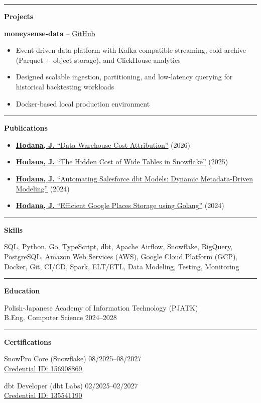 \documentclass[11pt,a4paper]{article}
\begin{document}
\rule{\textwidth}{0.5pt}

\textbf{Projects}

\textbf{moneysense-data} -- \href{https://github.com/joachimhodana/moneysense-data}{GitHub}
\begin{itemize}
\item Event-driven data platform with Kafka-compatible streaming, cold archive (Parquet + object storage), and ClickHouse analytics
\item Designed scalable ingestion, partitioning, and low-latency querying for historical backtesting workloads
\item Docker-based local production environment
\end{itemize}

\rule{\textwidth}{0.5pt}

\textbf{Publications}

\begin{itemize}
\item \href{https://medium.com/lortech-solutions-technical-blog/no-idea-where-your-data-warehouse-spend-goes-7d600666993e}{\textbf{Hodana, J.} ``Data Warehouse Cost Attribution''} (2026)
\item \href{https://medium.com/lortech-solutions-technical-blog/the-hidden-cost-of-wide-tables-in-snowflake-ab4757902c57}{\textbf{Hodana, J.} ``The Hidden Cost of Wide Tables in Snowflake''} (2025)
\item \href{https://medium.com/lortech-solutions-technical-blog/automating-salesforce-dbt-models-dynamic-metadata-driven-modeling-df3fe2498da2}{\textbf{Hodana, J.} ``Automating Salesforce \textrightarrow{} dbt Models: Dynamic Metadata-Driven Modeling''} (2024)
\item \href{https://medium.com/lortech-solutions-technical-blog/how-i-managed-to-efficiently-store-google-places-in-my-database-without-blowing-the-budget-7abca28637a8}{\textbf{Hodana, J.} ``Efficient Google Places Storage using Golang''} (2024)
\end{itemize}

\rule{\textwidth}{0.5pt}

\textbf{Skills}

SQL, Python, Go, TypeScript, dbt, Apache Airflow, Snowflake, BigQuery, PostgreSQL, Amazon Web Services (AWS), Google Cloud Platform (GCP), Docker, Git, CI/CD, Spark, ELT/ETL, Data Modeling, Testing, Monitoring

\rule{\textwidth}{0.5pt}

\textbf{Education}

Polish-Japanese Academy of Information Technology (PJATK) \\
B.Eng. Computer Science \hfill 2024--2028

\rule{\textwidth}{0.5pt}

\textbf{Certifications}

SnowPro Core (Snowflake) \hfill 08/2025--08/2027 \\
\href{https://achieve.snowflake.com/31ea4326-9e88-4148-a8b5-20326f786e50}{Credential ID: 156908869}

dbt Developer (dbt Labs) \hfill 02/2025--02/2027 \\
\href{https://credentials.getdbt.com/75e67339-1260-4bb4-bb4e-efbb9c0bc774}{Credential ID: 135541190}
\end{document}
